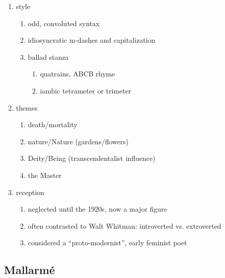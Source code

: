 \documentclass[12pt]{article}
\begin{document}
\begin{enumerate}
\item style
    \begin{enumerate}
    \item odd, convoluted syntax
    \item idiosyncratic m-dashes and capitalization
    \item ballad stanza
        \begin{enumerate}
        \item quatrains, ABCB rhyme
        \item iambic tetrameter or trimeter
        \end{enumerate}
    \end{enumerate}
\item themes
    \begin{enumerate}
    \item death/mortality
    \item nature/Nature (gardens/flowers)
    \item Deity/Being (transcendentalist influence)
    \item the Master
    \end{enumerate}
\item reception
    \begin{enumerate}
    \item neglected until the 1920s, now a major figure
    \item often contrasted to Walt Whitman: introverted vs. extroverted
    \item considered a ``proto-modernist'', early feminist poet
    \end{enumerate}
\end{enumerate}

\subsection{Mallarm\'{e}}
\end{document}
